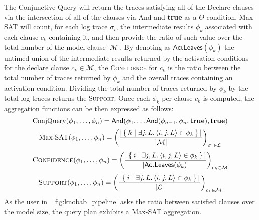 The {Conjunctive Query} will return the traces satisfying all of the Declare clauses via the intersection of all of the clauses via \textsf{And} and \textbf{true} as a $\Theta$ condition. Max-SAT will count, for each log trace $\sigma_i$, the intermediate results $\phi_k$ associated with each clause $c_k$ containing it, and then provide the ratio of such value over the total number of the model clause $|\mathcal{M}|$. By denoting as $\textsf{ActLeaves}(\phi_k)$ the untimed union of the intermediate results returned by the activation conditions for the declare clause $c_k\in\mathcal{M}$, the \textsc{Confidence} for $c_k$ is the ratio between the total number of traces returned by $\phi_k$ and the overall traces containing an activation condition. Dividing the total number of traces returned by $\phi_k$ by the total log traces returns the \textsc{Support}. Once each $\phi_k$ per clause $c_k$ is computed, the aggregation functions can be then expressed as follows:
\[\textup{ConjQuery}(\phi_1,\dots,\phi_n)=\textsf{And}(\phi_1,\dots\textsf{And}(\phi_{n-1},\phi_n,\textbf{true}),\textbf{true})\]
\[\textup{Max-SAT}(\phi_1,\dots,\phi_n)=\left(\frac{|\Set{k|\exists j,L. \braket{i,j,L}\in\phi_k}|}{|\mathcal{M}|}\right)_{\sigma^i\in \mathcal{L}}\]
\[\textsc{Confidence}(\phi_1,\dots,\phi_n)=\left(\frac{|\Set{i|\exists j,L. \braket{i,j,L}\in \phi_k}|}{|\textsf{ActLeaves}(\phi_k)|}\right)_{c_k\in \mathcal{M}}\]
\[\textsc{Support}(\phi_1,\dots,\phi_n)=\left(\frac{|\Set{i|\exists j,L. \braket{i,j,L}\in \phi_k}|}{|\mathcal{L}|}\right)_{c_k\in \mathcal{M}}\]
As the user in \figurename~\ref{fig:knobab_pipeline} asks the ratio between satisfied clauses over the model size, the query plan exhibits a Max-SAT aggregation.

